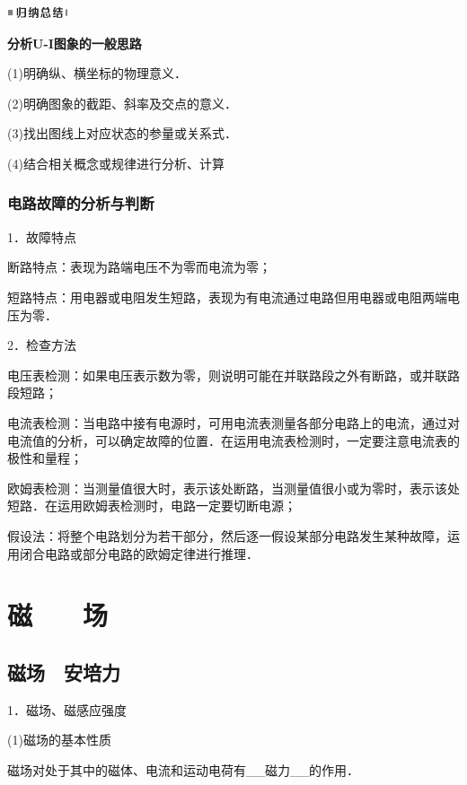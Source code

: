 \documentclass[cn,10.5pt,chinese,mac,chinesefont=founder]{elegantbook}
\begin{document}
\begin{center}\includegraphics[width=0.70764in,height=0.12292in]{media/image13.png}\end{center}
\begin{center}
	\textbf{分析U-I图象的一般思路}
\end{center}


(1)明确纵、横坐标的物理意义．

(2)明确图象的截距、斜率及交点的意义．

(3)找出图线上对应状态的参量或关系式．

(4)结合相关概念或规律进行分析、计算


\subsection{电路故障的分析与判断}

1．故障特点

断路特点：表现为路端电压不为零而电流为零；

短路特点：用电器或电阻发生短路，表现为有电流通过电路但用电器或电阻两端电压为零．

2．检查方法

电压表检测：如果电压表示数为零，则说明可能在并联路段之外有断路，或并联路段短路；

电流表检测：当电路中接有电源时，可用电流表测量各部分电路上的电流，通过对电流值的分析，可以确定故障的位置．在运用电流表检测时，一定要注意电流表的极性和量程；

欧姆表检测：当测量值很大时，表示该处断路，当测量值很小或为零时，表示该处短路．在运用欧姆表检测时，电路一定要切断电源；

假设法：将整个电路划分为若干部分，然后逐一假设某部分电路发生某种故障，运用闭合电路或部分电路的欧姆定律进行推理．


\chapter{磁　　场}

\section{磁场　安培力}

1．磁场、磁感应强度

(1)磁场的基本性质

磁场对处于其中的磁体、电流和运动电荷有\_\_磁力\_\_的作用．
\end{document}

